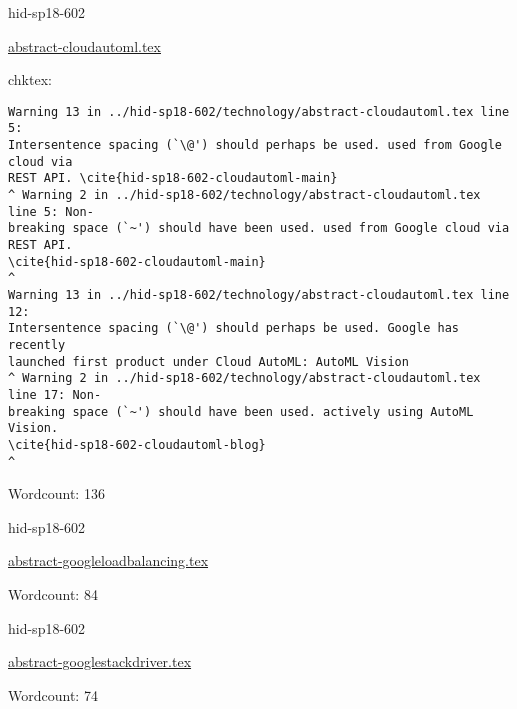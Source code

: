 \begin{IU}

hid-sp18-602

\href{https://github.com/cloudmesh-community/hid-sp18-602/blob/master//technology/abstract-cloudautoml.tex}{abstract-cloudautoml.tex}

 
chktex:
\begin{tiny}
\begin{verbatim}
Warning 13 in ../hid-sp18-602/technology/abstract-cloudautoml.tex line 5:
Intersentence spacing (`\@') should perhaps be used. used from Google cloud via
REST API. \cite{hid-sp18-602-cloudautoml-main}
^ Warning 2 in ../hid-sp18-602/technology/abstract-cloudautoml.tex line 5: Non-
breaking space (`~') should have been used. used from Google cloud via REST API.
\cite{hid-sp18-602-cloudautoml-main}                                        ^
Warning 13 in ../hid-sp18-602/technology/abstract-cloudautoml.tex line 12:
Intersentence spacing (`\@') should perhaps be used. Google has recently
launched first product under Cloud AutoML: AutoML Vision
^ Warning 2 in ../hid-sp18-602/technology/abstract-cloudautoml.tex line 17: Non-
breaking space (`~') should have been used. actively using AutoML Vision.
\cite{hid-sp18-602-cloudautoml-blog}                                  ^
\end{verbatim}
\end{tiny}

Wordcount: 136

\end{IU}



\begin{IU}

hid-sp18-602

\href{https://github.com/cloudmesh-community/hid-sp18-602/blob/master//technology/abstract-googleloadbalancing.tex}{abstract-googleloadbalancing.tex}

 

Wordcount: 84

\end{IU}



\begin{IU}

hid-sp18-602

\href{https://github.com/cloudmesh-community/hid-sp18-602/blob/master//technology/abstract-googlestackdriver.tex}{abstract-googlestackdriver.tex}

 

Wordcount: 74

\end{IU}

